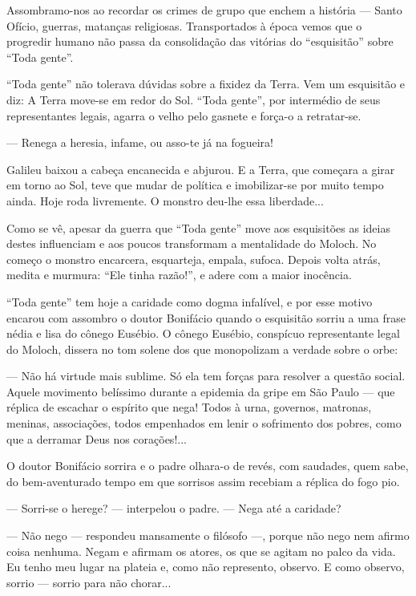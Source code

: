 Assombramo-nos ao recordar os crimes de grupo que enchem a história ---
Santo Ofício, guerras, matanças religiosas. Transportados à época vemos
que o progredir humano não passa da consolidação das vitórias do
``esquisitão'' sobre ``Toda gente''.

``Toda gente'' não tolerava dúvidas sobre a fixidez da Terra. Vem um
esquisitão e diz: A Terra move-se em redor do Sol. ``Toda gente'', por
intermédio de seus representantes legais, agarra o velho pelo gasnete e
força-o a retratar-se.

--- Renega a heresia, infame, ou asso-te já na fogueira!

Galileu baixou a cabeça encanecida e abjurou. E a Terra, que começara a
girar em torno ao Sol, teve que mudar de política e imobilizar-se por
muito tempo ainda. Hoje roda livremente. O monstro deu-lhe essa
liberdade...

Como se vê, apesar da guerra que ``Toda gente'' move aos esquisitões as
ideias destes influenciam e aos poucos transformam a mentalidade do
Moloch. No começo o monstro encarcera, esquarteja, empala, sufoca.
Depois volta atrás, medita e murmura: ``Ele tinha razão!'', e adere com
a maior inocência.

``Toda gente'' tem hoje a caridade como dogma infalível, e por esse
motivo encarou com assombro o doutor Bonifácio quando o esquisitão
sorriu a uma frase nédia e lisa do cônego Eusébio. O cônego Eusébio,
conspícuo representante legal do Moloch, dissera no tom solene dos que
monopolizam a verdade sobre o orbe:

--- Não há virtude mais sublime. Só ela tem forças para resolver a
questão social. Aquele movimento belíssimo durante a epidemia da gripe
em São Paulo --- que réplica de escachar o espírito que nega! Todos à
urna, governos, matronas, meninas, associações, todos empenhados em
lenir o sofrimento dos pobres, como que a derramar Deus nos corações!...

O doutor Bonifácio sorrira e o padre olhara-o de revés, com saudades,
quem sabe, do bem-aventurado tempo em que sorrisos assim recebiam a
réplica do fogo pio.

--- Sorri-se o herege? --- interpelou o padre. --- Nega até a caridade?

--- Não nego --- respondeu mansamente o filósofo ---, porque não nego
nem afirmo coisa nenhuma. Negam e afirmam os atores, os que se agitam no
palco da vida. Eu tenho meu lugar na plateia e, como não represento,
observo. E como observo, sorrio --- sorrio para não chorar...

